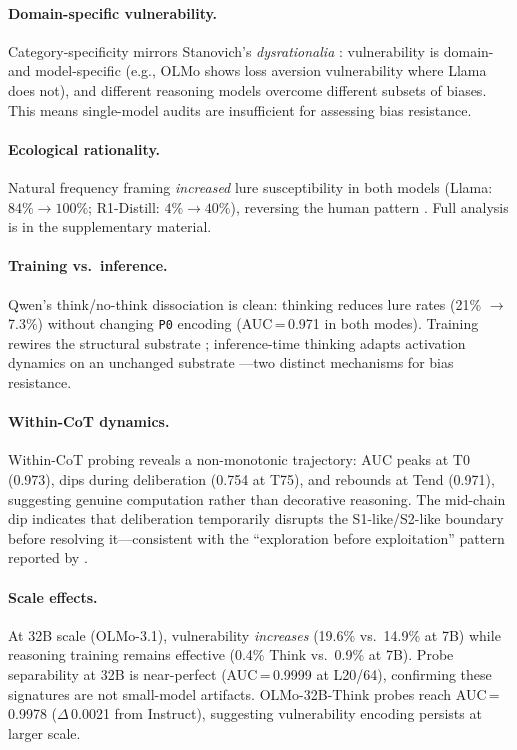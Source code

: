 \documentclass[accepted]{article}
\newcommand{\sone}{S1-like}
\newcommand{\stwo}{S2-like}
\newcommand{\pzero}{\texttt{P0}}
\begin{document}
\paragraph{Domain-specific vulnerability.}
Category-specificity mirrors Stanovich's \emph{dysrationalia}
\citep{stanovich2016rationality}: vulnerability is domain- and
model-specific (e.g., OLMo shows loss aversion vulnerability where Llama
does not), and different reasoning models overcome different subsets of
biases.  This means single-model audits are insufficient for assessing
bias resistance.

\paragraph{Ecological rationality.}
Natural frequency framing \emph{increased} lure susceptibility in both
models (Llama: $84\% \to 100\%$; R1-Distill: $4\% \to 40\%$), reversing
the human pattern \citep{gigerenzer1995improve}.  Full analysis is in the
supplementary material.

\paragraph{Training vs.\ inference.}
Qwen's think/no-think dissociation is clean: thinking reduces lure rates
(21\% $\to$ 7.3\%) without changing \pzero{} encoding (AUC\,=\,0.971 in
both modes).  Training rewires the structural substrate
\citep{kolb2013brain}; inference-time thinking adapts activation dynamics
on an unchanged substrate \citep{ziabari2025reasoning,
codaforno2025dual}---two distinct mechanisms for bias resistance.

\paragraph{Within-CoT dynamics.}
Within-CoT probing reveals a non-monotonic trajectory: AUC peaks at T0 (0.973), dips during deliberation (0.754 at T75), and rebounds at Tend (0.971), suggesting genuine computation rather than decorative reasoning.  The mid-chain dip indicates that deliberation temporarily disrupts the \sone{}/\stwo{} boundary before resolving it---consistent with the ``exploration before exploitation'' pattern reported by \citet{boppana2026reasoning}.

\paragraph{Scale effects.}
At 32B scale (OLMo-3.1), vulnerability \emph{increases} (19.6\% vs.\ 14.9\% at 7B) while reasoning training remains effective (0.4\% Think vs.\ 0.9\% at 7B).  Probe separability at 32B is near-perfect (AUC\,=\,0.9999 at L20/64), confirming these signatures are not small-model artifacts.  OLMo-32B-Think probes reach AUC\,=\,0.9978 ($\Delta$\,0.0021 from Instruct), suggesting vulnerability encoding persists at larger scale.
\end{document}
